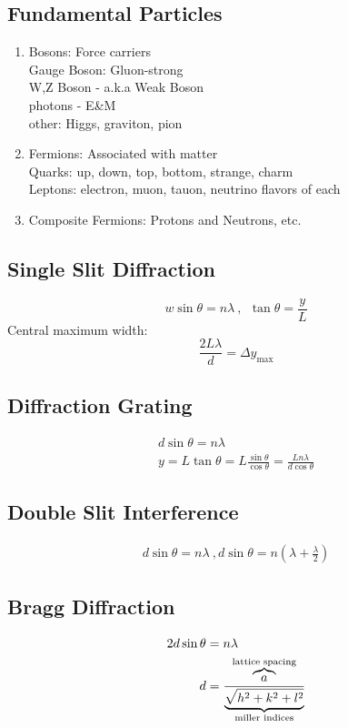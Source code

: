 \documentclass[10pt,letter]{article}
\begin{document}
\subsection{Fundamental Particles}
\begin{enumerate}
    \item Bosons: Force carriers\\
     Gauge Boson: Gluon-strong\\
     W,Z Boson - a.k.a Weak Boson\\
     photons - E\&M\\
     other: Higgs, graviton, pion
    \item Fermions: Associated with matter\\
    Quarks: up, down, top, bottom, strange, charm\\
    Leptons: electron, muon, tauon, neutrino flavors of each
    \item Composite Fermions: Protons and Neutrons, etc.
\end{enumerate}

\subsection{Single Slit Diffraction}
\begin{equation}
 w\sin \theta = n\lambda~,~~\tan\theta = \frac{y}{L} 
\end{equation}
Central maximum width:
\begin{equation}
 \frac{2L\lambda}{d} = \Delta y_{\textrm{max}}
\end{equation}

\subsection{Diffraction Grating}
\begin{align}
 d\sin\theta = n \lambda\\
 y = L \tan \theta = L\frac{\sin\theta}{\cos\theta} = \frac{Ln\lambda}{d\cos\theta}
\end{align}

\subsection{Double Slit Interference}
\begin{align}
 d\sin\theta = n\lambda~, d\sin\theta = n \left( \lambda + \frac{\lambda}{2} \right) 
\end{align}

\subsection{Bragg Diffraction}
\begin{align}
 2d\sin\theta &= n\lambda\\
 d &= \frac{\overbrace{a}^{\mathclap{\textrm{lattice spacing}}}}{\underbrace{\sqrt{h^2 + k^2 + l^2}}_{ \mathclap{\textrm{miller indices} } } }
\end{align}
\end{document}
